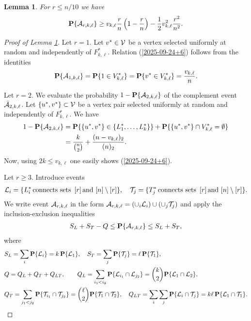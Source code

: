 \documentclass[11pt, a4paper]{article}
\newcommand{\PP}{{\bf{P}}}
\newtheorem{lem}{Lemma}
\begin{document}
\begin{lem} \label{2025-11-20+8} For 
$r\le n/10$ we have
\begin{align}
\label{2025-09-24+6}
\PP\{{\cal A}_{r,k,\ell}\}
\ge 
 v_{k,\ell}\frac{r}{n}\left(1-\frac{r}{n}\right)
 -
 \frac{1}{2}
v^2_{k,\ell}\frac{r^2}{n^2}.
\end{align}
\end{lem}

\begin{proof}[Proof of Lemma \ref{2025-11-20+8}]
Let $r=1$. Let $v^*\in{\cal V}$  be a vertex selected uniformly at random  and independently of $F_{k,\ell}^*$. Relation (\ref{2025-09-24+6}) follows  from the identities
\begin{align*}
\PP\{{\cal A}_{1,k,\ell}\}=\PP\{1\in V_{k,\ell}^*\}
=\PP\{v^*\in V_{k,\ell}^*\}
=\frac{v_{k,\ell}}{n}.
\end{align*}

Let $r=2$. We evaluate the probability 
$1-\PP\{{\cal A}_{2,k,\ell}\}$ of the complement event 
${\bar {\cal A}}_{2,k,\ell}$. 
Let
$\{u^*,v^*\}\subset {\cal V}$  be a vertex pair selected uniformly at random and independently of $F_{k,\ell}^*$.
We have 
\begin{align*}
1-\PP\{{\cal A}_{2,k,\ell}\}
&
=
\PP\{\{u^*,v^*\}\in \{L^*_1,\dots, L^*_k\}\}
+
\PP\{\{u^*,v^*\}\cap V_{k,\ell}^*=\emptyset\}
\\
&
=
\frac{k}{\binom{n}{2}}
+
\frac{(n-v_{k,\ell})_2}{(n)_2}.
\end{align*}
Now, using $2k\le v_{k,\ell}$ one easily shows 
(\ref{2025-09-24+6}).


Let $r\ge 3$.
Introduce events 
\begin{align*}
{\cal L}_i
=
\{
L^*_i 
\,
{\text{connects sets }}
\,
[r]
\,
{\text{and}}
\
[n]\setminus[r]
\},
\quad
{\cal T}_j
=
\{
T^*_j
\,
{\text{connects sets }}
\,
[r]
\,
{\text{and}}
\
[n]\setminus[r]
\}.
\end{align*}
We write event ${\cal A}_{r,k,\ell}$ in the form 
${\cal A}_{r,k,\ell}
=
\left(\cup_{i}{\cal L}_i\right)\cup\left(\cup_{j}{\cal T}_j\right)$ and apply
the inclusion-exclusion inequalities
\begin{align}
\label{2025-09-26+2}
S_L+S_T-Q
\le
\PP\{{\cal A}_{r,k,\ell}\}
\le 
S_L+S_T,
\end{align}
where 
\begin{align*}
&
S_L
=
\sum_i\PP\{{\cal L}_i\}
=
k
\,
\PP\{{\cal L}_1\},
\quad 
S_T
=
\sum_{j}\PP\{{\cal T}_j\}
=
\ell
\,
\PP\{{\cal T}_{1}\},
\\
&
Q=Q_L+Q_T+Q_{LT},
\qquad
 Q_L
 =
 \sum_{i_1<i_2}\PP\{{\cal L}_{i_1}\cap{\cal L}_{j_2}\}
 =
 \binom{k}{2}
 \PP\{{\cal L}_{1}\cap{\cal L}_{2}\},
 \\
 &
 Q_T=\sum_{j_1<j_2}\PP\{{\cal T}_{i_1}\cap{\cal T}_{j_2}\}
 =
 \binom{\ell}{2}
 \PP\{{\cal T}_{1}\cap{\cal T}_{2}\},
 \quad
 Q_{LT}
 =
 \sum_{i}\sum_{j}
 \PP\{{\cal L}_{i}\cap{\cal T}_{j}\}
 =
 k\ell
 \,\PP\{{\cal L}_{1}\cap{\cal T}_{1}\}.
 \end{align*}
 

\end{proof}
\end{document}
